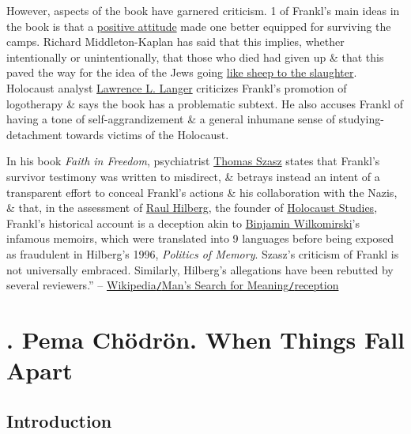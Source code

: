 \documentclass[oneside]{book}
\numberwithin{equation}{section}
\begin{document}
However, aspects of the book have garnered criticism. 1 of Frankl's main ideas in the book is that a \href{https://en.wikipedia.org/wiki/Positive_mental_attitude}{positive attitude} made one better equipped for surviving the camps. Richard Middleton-Kaplan has said that this implies, whether intentionally or unintentionally, that those who died had given up \& that this paved the way for the idea of the Jews going \href{https://en.wikipedia.org/wiki/Like_sheep_to_the_slaughter}{like sheep to the slaughter}. Holocaust analyst \href{https://en.wikipedia.org/wiki/Lawrence_L._Langer}{Lawrence L. Langer} criticizes Frankl's promotion of logotherapy \& says the book has a problematic subtext. He also accuses Frankl of having a tone of self-aggrandizement \& a general inhumane sense of studying-detachment towards victims of the Holocaust.

In his book \textit{Faith in Freedom}, psychiatrist \href{https://en.wikipedia.org/wiki/Thomas_Szasz}{Thomas Szasz} states that Frankl's survivor testimony was written to misdirect, \& betrays instead an intent of a transparent effort to conceal Frankl's actions \& his collaboration with the Nazis, \& that, in the assessment of \href{https://en.wikipedia.org/wiki/Raul_Hilberg}{Raul Hilberg}, the founder of \href{https://en.wikipedia.org/wiki/Holocaust_studies}{Holocaust Studies}, Frankl's historical account is a deception akin to \href{https://en.wikipedia.org/wiki/Fragments:_Memories_of_a_Wartime_Childhood}{Binjamin Wilkomirski}'s infamous memoirs, which were translated into 9 languages before being exposed as fraudulent in Hilberg's 1996, \textit{Politics of Memory}. Szasz's criticism of Frankl is not universally embraced. Similarly, Hilberg's allegations have been rebutted by several reviewers.'' -- \href{https://en.wikipedia.org/wiki/Man%27s_Search_for_Meaning#Reception}{Wikipedia\texttt{/}Man's Search for Meaning\texttt{/}reception}


\chapter{\cite{Chodron2002}. Pema Ch\"odr\"on. When Things Fall Apart}


\section*{Introduction}
\end{document}
